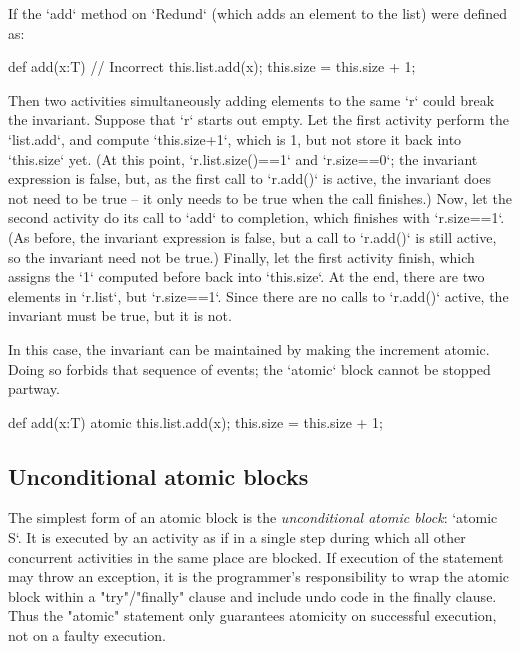 If the \xcd`add` method on \xcd`Redund` (which adds an element to the list) 
were defined as: 
\begin{xten}
def add(x:T) { // Incorrect
  this.list.add(x);
  this.size = this.size + 1;
}
\end{xten}
Then two activities simultaneously adding elements to the same \xcd`r` could break the
invariant.  Suppose that \xcd`r` starts out empty.  Let the first activity
perform the \xcd`list.add`, and compute \xcd`this.size+1`, which is 1, but not store it
back into \xcd`this.size` yet.  
(At this point, \xcd`r.list.size()==1` and \xcd`r.size==0`; the invariant
expression is false, but, as the first call to \xcd`r.add()` is active, the
invariant does not need to be true -- it only needs to be true when the
call finishes.)
Now, let the second activity do its call to
\xcd`add` to completion, which finishes with \xcd`r.size==1`.  
(As before, the invariant expression is false, but a call to \xcd`r.add()` is
still active, so the invariant need not be true.)
Finally, let
the first activity finish, which assigns the \xcd`1` computed before back into
\xcd`this.size`.  At the end, there are two elements in \xcd`r.list`, but
\xcd`r.size==1`. Since there are no calls to \xcd`r.add()` active, the
invariant must be true, but it is not.

In this case, the invariant can be maintained by making the increment atomic.
Doing so forbids that sequence of events; the \xcd`atomic` block cannot be
stopped partway.  
\begin{xten}
def add(x:T) { 
  atomic {
    this.list.add(x);
    this.size = this.size + 1; 
  }
}
\end{xten}

\subsection{Unconditional atomic blocks}
The simplest form of an atomic block is the {\em unconditional
atomic block}: \xcd`atomic S`.
It is executed by an activity as if in a single step
during which all other concurrent activities in the same place are
blocked. If execution of the statement may throw an exception, it is
the programmer's responsibility to wrap the atomic block within a
\xcd"try"/\xcd"finally" clause and include undo code in the finally
clause. Thus the \xcd"atomic" statement only guarantees atomicity on
successful execution, not on a faulty execution.



